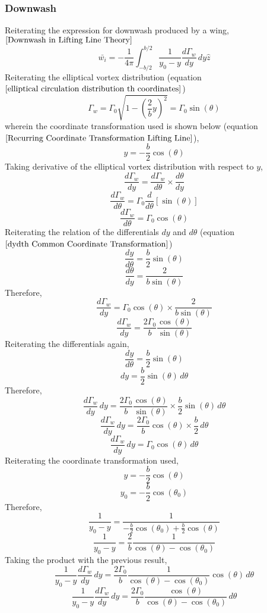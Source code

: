 \documentclass[a4paper, 12pt]{report}
\begin{document}
\begin{center}
\subsubsection{Downwash}
\begin{comment}
\end{comment}
Reiterating the expression for downwash produced by a wing, $\ref{Downwash in Lifting Line Theory}$
$$\bar{w_{i}} = -\frac{1}{4\pi} \int^{b/2}_{-b/2}\frac{1}{y_{0}-y}\frac{d\Gamma_{w}}{dy} \,dy\hat{z}$$
Reiterating the elliptical vortex distribution (equation $\ref{elliptical circulation distribution th coordinates}$)
$$\Gamma_{w} = \Gamma_{0}\sqrt{1-\left(\frac{2}{b}y\right)^{2}} = \Gamma_{0}\sin(\theta)$$
wherein the coordinate transformation used is shown below (equation $\ref{Recurring Coordinate Transformation Lifting Line}$),
$$y = -\frac{b}{2}\cos(\theta)$$
Taking derivative of the elliptical vortex distribution with respect to $y$,
$$\frac{d\Gamma_{w}}{dy} = \frac{d\Gamma_{w}}{d\theta}\times\frac{d\theta}{dy}$$
$$\frac{d\Gamma_{w}}{d\theta} = \Gamma_{0}\frac{d}{d \theta}\left[\sin(\theta)\right]$$
$$\frac{d\Gamma_{w}}{d\theta} = \Gamma_{0}\cos(\theta)$$
Reiterating the relation of the differentials $dy$ and $d\theta$ (equation $\ref{dydth Common Coordinate Transformation}$)
$$\frac{dy}{d\theta} = \frac{b}{2}\sin(\theta)$$
$$\frac{d\theta}{dy} = \frac{2}{b\sin(\theta)}$$
Therefore,
$$\frac{d\Gamma_{w}}{dy} = \Gamma_{0}\cos(\theta) \times\frac{2}{b\sin(\theta)}$$
$$\frac{d\Gamma_{w}}{dy} = \frac{2\Gamma_{0}}{b}\frac{\cos(\theta)}{\sin(\theta)}$$
Reiterating the differentials again,
$$\frac{dy}{d\theta} = \frac{b}{2}\sin(\theta)$$
$$dy = \frac{b}{2}\sin(\theta)\, d\theta$$
Therefore,
$$\frac{d\Gamma_{w}}{dy}\,dy = \frac{2\Gamma_{0}}{b}\frac{\cos(\theta)}{\sin(\theta)}\times\frac{b}{2}\sin(\theta)\, d\theta$$
$$\frac{d\Gamma_{w}}{dy}\,dy = \frac{2\Gamma_{0}}{b}\cos(\theta) \times \frac{b}{2}\, d\theta$$
$$\frac{d\Gamma_{w}}{dy}\,dy = \Gamma_{0}\cos(\theta) \,d\theta$$
Reiterating the coordinate transformation used,
$$y = -\frac{b}{2}\cos(\theta)$$
$$y_{0} = -\frac{b}{2}\cos(\theta_{0})$$
Therefore,
$$\frac{1}{y_{0}-y} = \frac{1}{\displaystyle -\frac{b}{2}\cos(\theta_{0})+ \frac{b}{2}\cos(\theta)}$$
$$\frac{1}{y_{0}-y} = \frac{2}{b}\frac{1}{\cos(\theta) - \cos(\theta_{0})}$$
Taking the product with the previous result,
$$ \frac{1}{y_{0}-y}\frac{d\Gamma_{w}}{dy}\,dy = \frac{2\Gamma_{0}}{b}\frac{1}{\cos(\theta) - \cos(\theta_{0})}\cos(\theta) \,d\theta$$
$$\frac{1}{y_{0}-y}\frac{d\Gamma_{w}}{dy}\,dy = \frac{2\Gamma_{0}}{b}\frac{\cos(\theta)}{\cos(\theta) - \cos(\theta_{0})}\,d\theta$$

\end{center}
\end{document}
